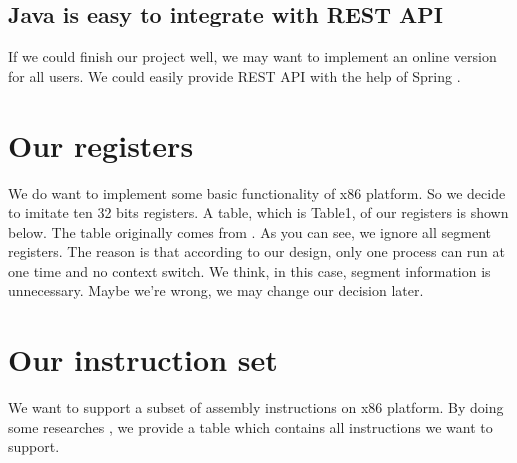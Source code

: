 \documentclass[12pt]{extarticle}
\begin{document}
        \subsection{Java is easy to integrate with REST API}
        If we could finish our project well, we may want to implement an online version for all users. We could easily provide REST API with the help of Spring \cite{walls2005spring}.
        \section{Our registers}
        We do want to implement some basic functionality of x86 platform. So we decide to imitate ten 32 bits registers. A table, which is Table1, of our registers is shown below.
        The table originally comes from \cite{kusswurm2014modern}.
        As you can see, we ignore all segment registers. The reason is that according to our design, only one process can run at one time and no context switch.
        We think, in this case, segment information is unnecessary. Maybe we're wrong, we may change our decision later.  
        \section{Our instruction set}
        We want to support a subset of assembly instructions on x86 platform. 
        By doing some researches \cite{kusswurm2014modern}, we provide a table which contains all instructions we want to support.
\end{document}
